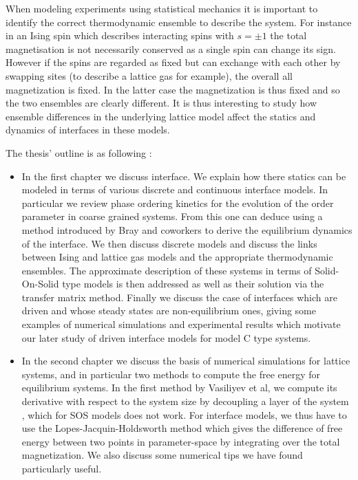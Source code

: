 When modeling experiments using statistical mechanics it is important to identify the correct thermodynamic ensemble to describe the system. For instance in an Ising spin which describes interacting spins with $s=\pm 1$ the total magnetisation is not necessarily conserved as a single spin can change its sign. However if the spins are regarded as fixed but can exchange with each other by swapping sites (to describe a lattice gas for example), the overall all magnetization is fixed. In the latter case the magnetization is thus fixed and so the two ensembles are clearly different. It is thus interesting to study how ensemble differences in the underlying lattice model affect the statics and dynamics of interfaces in these models.


The thesis' outline is as following :
\begin{itemize}
    \item In the first chapter we discuss interface. We explain how there statics can be modeled in terms of various discrete and continuous interface models. In particular we review phase ordering kinetics for the evolution of the order parameter in coarse grained systems. From this one can deduce using a method introduced by Bray and coworkers \cite{bray_interface_2001} to derive the equilibrium dynamics of the interface. We then discuss discrete models and discuss the links between Ising and lattice gas models and the appropriate thermodynamic ensembles. The approximate description of these systems in terms of Solid-On-Solid type models is then addressed as well as their solution via the transfer matrix method. Finally we discuss the case of interfaces which are driven and whose steady states are non-equilibrium ones, giving some examples of numerical simulations and experimental results which motivate our later study of driven interface models for model C type systems.
    \item{\color{red} In the second chapter we discuss the basis of numerical simulations \cite{newman_monte_1999} for lattice systems, and in particular two methods to compute the free energy for equilibrium systems. In the first method by Vasiliyev et al, we compute its derivative with respect to the system size by decoupling a layer of the system \cite{vasilyev_universal_2009}, which for SOS models does not work. For interface models, we thus have to use the Lopes-Jacquin-Holdsworth method \cite{lopes_cardozo_critical_2014} which gives the difference of free energy between two points in parameter-space by integrating over the total magnetization. We also discuss some numerical tips we have found particularly useful.}

\end{itemize}
